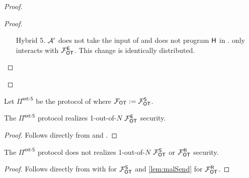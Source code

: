 \begin{proof}
\begin{proof}
\begin{enumerate}[leftmargin=1.8cm]
			\item[Hybrid 5.] $\mathcal{A}'$ does not take the input of \send and does not program $\mathsf{H}$ in . \send only interacts with $\mathcal{F}_{\mathsf{OT}}^\mathsf{E}$. This change is identically distributed.
		\end{enumerate}
	\end{proof}
\end{proof}



\begin{definition}\label{def:ext_S_U}
	Let $\Pi^{\textsf{ext-S}}$ be the protocol of  where $\mathcal{F}_{\mathsf{OT}}:=\mathcal{F}_{\mathsf{OT}}^\mathsf{S}$.
\end{definition}
\begin{lemma}
	The $\Pi^\textsf{ext-S}$ protocol realizes 1-out-of-$N$ $\mathcal{F}_{\mathsf{OT}}^\mathsf{E}$ security.
\end{lemma}
\begin{proof}
	Follows directly from  and .
\end{proof}
\begin{lemma}
		The $\Pi^\textsf{ext-S}$ protocol does not realizes 1-out-of-$N$ $\mathcal{F}_{\mathsf{OT}}^\mathsf{S}$ or $\mathcal{F}_{\mathsf{OT}}^\mathsf{R}$ security.
\end{lemma}
\begin{proof}
	Follows directly from  with  for $\mathcal{F}_{\mathsf{OT}}^\mathsf{S}$ and \ref{lem:malSend} for $\mathcal{F}_{\mathsf{OT}}^\mathsf{R}$.
\end{proof}



